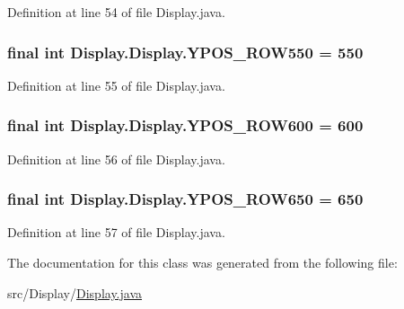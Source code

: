 Definition at line 54 of file Display.\+java.

\hypertarget{class_display_1_1_display_a18e8f506bdeb1ffce18d4e17eacfc1c9}{}
\subsubsection[{Y\+P\+O\+S\+\_\+\+R\+O\+W550}]{\setlength{\rightskip}{0pt plus 5cm}final int Display.\+Display.\+Y\+P\+O\+S\+\_\+\+R\+O\+W550 = 550\hspace{0.3cm}{\ttfamily [static]}}\label{class_display_1_1_display_a18e8f506bdeb1ffce18d4e17eacfc1c9}


Definition at line 55 of file Display.\+java.

\hypertarget{class_display_1_1_display_aeb7358eb4ef9314e129e3636eaee48b2}{}
\subsubsection[{Y\+P\+O\+S\+\_\+\+R\+O\+W600}]{\setlength{\rightskip}{0pt plus 5cm}final int Display.\+Display.\+Y\+P\+O\+S\+\_\+\+R\+O\+W600 = 600\hspace{0.3cm}{\ttfamily [static]}}\label{class_display_1_1_display_aeb7358eb4ef9314e129e3636eaee48b2}


Definition at line 56 of file Display.\+java.

\hypertarget{class_display_1_1_display_a60296fc1277e58422d02f8f462ad95c5}{}
\subsubsection[{Y\+P\+O\+S\+\_\+\+R\+O\+W650}]{\setlength{\rightskip}{0pt plus 5cm}final int Display.\+Display.\+Y\+P\+O\+S\+\_\+\+R\+O\+W650 = 650\hspace{0.3cm}{\ttfamily [static]}}\label{class_display_1_1_display_a60296fc1277e58422d02f8f462ad95c5}


Definition at line 57 of file Display.\+java.



The documentation for this class was generated from the following file\+:\begin{DoxyCompactItemize}
\item 
src/\+Display/\hyperlink{_display_8java}{Display.\+java}\end{DoxyCompactItemize}
